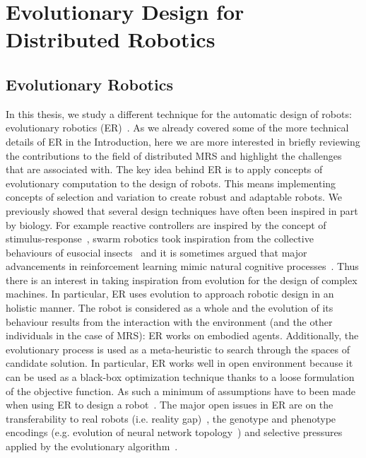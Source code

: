 
\section{Evolutionary Design for Distributed Robotics}

  \subsection{Evolutionary Robotics} %

    In this thesis, we study a different technique for the automatic design of robots: evolutionary robotics (ER)~\parencite{Nolfi2000, Doncieux2015a}. As we already covered some of the more technical details of ER in the Introduction, here we are more interested in briefly reviewing the contributions to the field of distributed MRS and highlight the challenges that are associated with. The key idea behind ER is to apply concepts of evolutionary computation to the design of robots. This means implementing concepts of selection and variation to create robust and adaptable robots. We previously showed that several design techniques have often been inspired in part by biology. For example reactive controllers are inspired by the concept of stimulus-response~\parencite{Brooks1986}, swarm robotics took inspiration from the collective behaviours of eusocial insects~\parencite{Bonabeau1999} and it is sometimes argued that major advancements in reinforcement learning mimic natural cognitive processes~\parencite{Montague1996}. Thus there is an interest in taking inspiration from evolution for the design of complex machines. In particular, ER uses evolution to approach robotic design in an holistic manner. The robot is considered as a whole and the evolution of its behaviour results from the interaction with the environment (and the other individuals in the case of MRS): ER works on embodied agents. Additionally, the evolutionary process is used as a meta-heuristic to search through the spaces of candidate solution. In particular, ER works well in open environment because it can be used as a black-box optimization technique thanks to a loose formulation of the objective function. As such a minimum of assumptions have to been made when using ER to design a robot~\parencite{Bongard2013a}. The major open issues in ER are on the transferability to real robots (i.e. reality gap)~\parencite{Mouret2012b, Cully2015}, the genotype and phenotype encodings (e.g. evolution of neural network topology~\parencite{Stanley2002}) and selective pressures applied by the evolutionary algorithm~\parencite{Lehman2011, Mouret2012a}.

